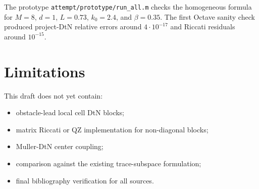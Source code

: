 \documentclass[11pt]{article}
\begin{document}
The prototype \texttt{attempt/prototype/run\_all.m} checks the homogeneous
formula for \(M=8\), \(d=1\), \(L=0.73\), \(k_0=2.4\), and \(\beta=0.35\).
The first Octave sanity check produced project-DtN relative errors around
\(4\cdot10^{-17}\) and Riccati residuals around \(10^{-15}\).

\section{Limitations}

This draft does not yet contain:
\begin{itemize}
  \item obstacle-lead local cell DtN blocks;
  \item matrix Riccati or QZ implementation for non-diagonal blocks;
  \item Muller-DtN center coupling;
  \item comparison against the existing trace-subspace formulation;
  \item final bibliography verification for all sources.
\end{itemize}



\end{document}
